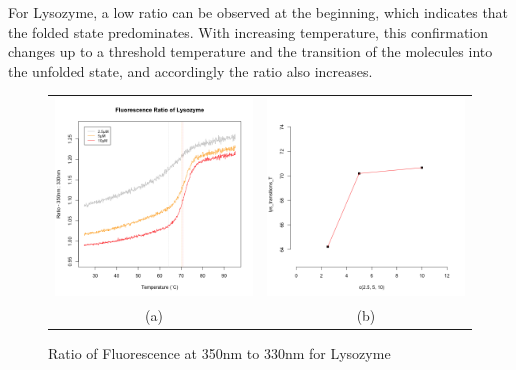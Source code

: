 \documentclass[a4paper,11pt]{article}
\begin{document}
            For Lysozyme, a low ratio can be observed at the beginning, which indicates that 
            the folded state predominates. With increasing temperature, this confirmation changes 
            up to a threshold temperature and the transition of the molecules into the unfolded state, 
            and accordingly the ratio also increases.
            \begin{figure}[H]
                \centering
                \begin{tabular}{cc}
                    \includegraphics[width=200px]{../resources/unfolding_lys_ratio.png} &
                    \includegraphics[width=200px]{../resources/unfolding_lys_tempVconc.png} \\
                    (a) & (b)\\
                \end{tabular}
                \caption{Ratio of Fluorescence at 350nm to 330nm for Lysozyme}
                \label{fig:lys_ratio}
            \end{figure}
            
\end{document}
